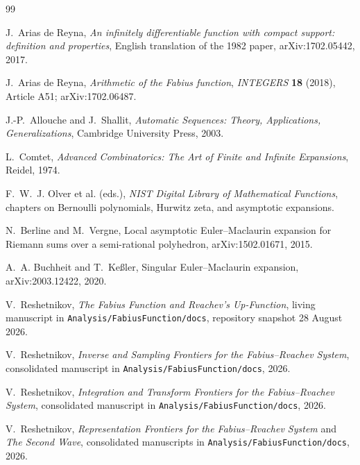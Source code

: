 \documentclass[11pt,oneside]{article}
\numberwithin{equation}{section}
\theoremstyle{definition}
\theoremstyle{remark}
\newcommand{\repo}{\texttt{Analysis/FabiusFunction/docs}}
\begin{document}
\begin{thebibliography}{99}

J.~Arias de Reyna,
\newblock \emph{An infinitely differentiable function with compact support: definition
and properties},
\newblock English translation of the 1982 paper, arXiv:1702.05442, 2017.

J.~Arias de Reyna,
\newblock \emph{Arithmetic of the Fabius function},
\newblock \emph{INTEGERS} \textbf{18} (2018), Article A51; arXiv:1702.06487.

J.-P.~Allouche and J.~Shallit,
\newblock \emph{Automatic Sequences: Theory, Applications, Generalizations},
\newblock Cambridge University Press, 2003.

L.~Comtet,
\newblock \emph{Advanced Combinatorics: The Art of Finite and Infinite Expansions},
\newblock Reidel, 1974.

F.~W.~J. Olver et al. (eds.),
\newblock \emph{NIST Digital Library of Mathematical Functions},
\newblock chapters on Bernoulli polynomials, Hurwitz zeta, and asymptotic expansions.

N.~Berline and M.~Vergne,
\newblock Local asymptotic Euler--Maclaurin expansion for Riemann sums over a
semi-rational polyhedron,
\newblock arXiv:1502.01671, 2015.

A.~A. Buchheit and T.~Ke\ss ler,
\newblock Singular Euler--Maclaurin expansion,
\newblock arXiv:2003.12422, 2020.

V.~Reshetnikov,
\newblock \emph{The Fabius Function and Rvachev's Up-Function},
\newblock living manuscript in \repo{}, repository snapshot 28 August 2026.

V.~Reshetnikov,
\newblock \emph{Inverse and Sampling Frontiers for the Fabius--Rvachev System},
\newblock consolidated manuscript in \repo{}, 2026.

V.~Reshetnikov,
\newblock \emph{Integration and Transform Frontiers for the Fabius--Rvachev System},
\newblock consolidated manuscript in \repo{}, 2026.

V.~Reshetnikov,
\newblock \emph{Representation Frontiers for the Fabius--Rvachev System} and
\emph{The Second Wave},
\newblock consolidated manuscripts in \repo{}, 2026.

\end{thebibliography}
\end{document}
